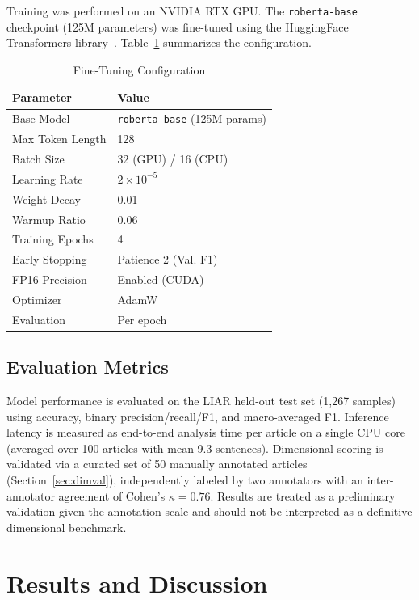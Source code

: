 \documentclass[journal]{IEEEtran}
\begin{document}
Training was performed on an NVIDIA RTX GPU. The \texttt{roberta-base} checkpoint (125M
parameters) was fine-tuned using the HuggingFace Transformers
library~\cite{wolf2020transformers}. Table~\ref{tab:training} summarizes the configuration.

\begin{table}[htbp]
\caption{Fine-Tuning Configuration}
\label{tab:training}
\centering
\begin{tabular}{ll}
\toprule
\textbf{Parameter} & \textbf{Value} \\
\midrule
Base Model        & \texttt{roberta-base} (125M params) \\
Max Token Length  & 128 \\
Batch Size        & 32 (GPU) / 16 (CPU) \\
Learning Rate     & $2 \times 10^{-5}$ \\
Weight Decay      & 0.01 \\
Warmup Ratio      & 0.06 \\
Training Epochs   & 4 \\
Early Stopping    & Patience 2 (Val. F1) \\
FP16 Precision    & Enabled (CUDA) \\
Optimizer         & AdamW \\
Evaluation        & Per epoch \\
\bottomrule
\end{tabular}
\end{table}

\subsection{Evaluation Metrics}

Model performance is evaluated on the LIAR held-out test set (1,267 samples) using accuracy,
binary precision/recall/F1, and macro-averaged F1. Inference latency is measured as
end-to-end analysis time per article on a single CPU core (averaged over 100 articles with
mean 9.3 sentences). Dimensional scoring is validated via a curated set of 50 manually
annotated articles (Section~\ref{sec:dimval}), independently labeled by two annotators
with an inter-annotator agreement of Cohen's $\kappa = 0.76$. Results are treated as a
preliminary validation given the annotation scale and should not be interpreted as a
definitive dimensional benchmark.

\section{Results and Discussion}
\label{sec:results}
\end{document}
